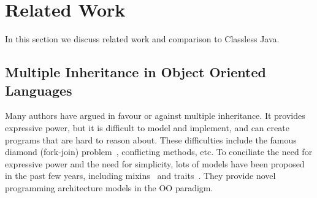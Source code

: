 \section{Related Work}\label{sec:related}
In this section we discuss related work and comparison to Classless Java.






\subsection{Multiple Inheritance in Object Oriented Languages}
Many authors have argued in favour or against multiple inheritance.  It provides
expressive power, but it is difficult to model and implement, and can create
programs that are hard to reason about.  These difficulties include the famous
diamond (fork-join) problem~\cite{bracha90mixin,Sak89dis}, conflicting methods, etc.
To conciliate the need for
expressive power and the need for simplicity, lots of models have been proposed
in the past few years, including mixins~\cite{bracha90mixin} and
traits~\cite{scharli03traits}.  They provide novel programming architecture
models in the OO paradigm.


